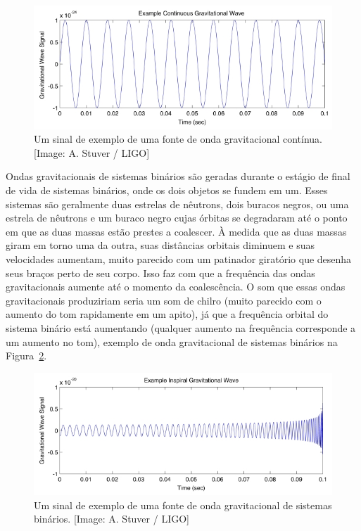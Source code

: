 \begin{figure}[ht]
\centering
\includegraphics[width=.9\textwidth]{figuras/continuous_tn.jpg}
\caption{Um sinal de exemplo de uma fonte de onda gravitacional contínua. [Image: A. Stuver / LIGO]}
\label{figondacontinua}
\end{figure}

Ondas gravitacionais de sistemas binários são geradas durante o estágio de final de vida de sistemas binários, onde os dois objetos se fundem em um. Esses sistemas são geralmente duas estrelas de nêutrons, dois buracos negros, ou uma estrela de nêutrons e um buraco negro cujas órbitas se degradaram até o ponto em que as duas massas estão prestes a coalescer. À medida que as duas massas giram em torno uma da outra, suas distâncias orbitais diminuem e suas velocidades aumentam, muito parecido com um patinador giratório que desenha seus braços perto de seu corpo. Isso faz com que a frequência das ondas gravitacionais aumente até o momento da coalescência. O som que essas ondas gravitacionais produziriam seria um som de chilro (muito parecido com o aumento do tom rapidamente em um apito), já que a frequência orbital do sistema binário está aumentando (qualquer aumento na frequência corresponde a um aumento no tom), exemplo de onda gravitacional de sistemas binários na Figura~\ref{figondainspiral}.

\begin{figure}[ht]
\centering
\includegraphics[width=.9\textwidth]{figuras/inspiral_tn.jpg}
\caption{Um sinal de exemplo de uma fonte de onda gravitacional de sistemas binários. [Image: A. Stuver / LIGO]}
\label{figondainspiral}
\end{figure}

